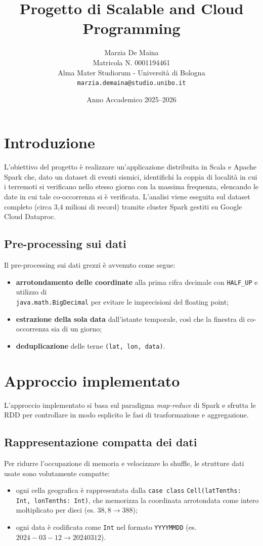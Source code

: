 \documentclass[11pt,a4paper]{article}
\title{\vspace{-1.5cm}Progetto di Scalable and Cloud Programming\\}
\author{Marzia De Maina\\
\small Matricola N. 0001194461\\
\small Alma Mater Studiorum - Università di Bologna\\
\small \texttt{marzia.demaina@studio.unibo.it}}
\date{Anno Accademico 2025--2026}
\begin{document}
\maketitle
\vspace{-0.8cm}


\section{Introduzione}
L'obiettivo del progetto è realizzare un'applicazione distribuita in Scala
e Apache Spark che, dato un dataset di eventi sismici, identifichi la coppia
di località in cui i terremoti si verificano nello stesso giorno con la
massima frequenza, elencando le date in cui tale co-occorrenza si è
verificata. L'analisi viene eseguita sul dataset completo (circa 3,4 milioni
di record) tramite cluster Spark gestiti su Google Cloud Dataproc.

\subsection{Pre-processing sui dati}
Il pre-processing sui dati grezzi è avvenuto come segue:
\begin{itemize}
    \item[-] \textbf{arrotondamento delle coordinate} alla prima cifra
    decimale con \texttt{HALF\_UP} e utilizzo di \\\texttt{java.math.BigDecimal} per evitare le imprecisioni del floating point;
    \item[-] \textbf{estrazione della sola data} dall'istante temporale, così
    che la finestra di co-occorrenza sia di un giorno;
    \item[-] \textbf{deduplicazione} delle terne \texttt{(lat, lon, data)}.
\end{itemize}

\section{Approccio implementato}

L'approccio implementato si basa sul paradigma \textit{map-reduce} di
Spark e sfrutta le RDD per controllare in modo esplicito le fasi di
trasformazione e aggregazione.

\subsection{Rappresentazione compatta dei dati}
Per ridurre l'occupazione di memoria e velocizzare lo shuffle, le strutture
dati usate sono volutamente compatte:
\begin{itemize}
    \item[-] ogni cella geografica è rappresentata dalla \texttt{case class}
    \texttt{Cell(latTenths: Int, lonTenths: Int)}, che memorizza la
    coordinata arrotondata come intero moltiplicato per dieci
    (es. $38{,}8 \rightarrow 388$);
    \item[-] ogni data è codificata come \texttt{Int} nel formato
    \texttt{YYYYMMDD} (es. $2024{-}03{-}12 \rightarrow 20240312$).
\end{itemize}
\end{document}
